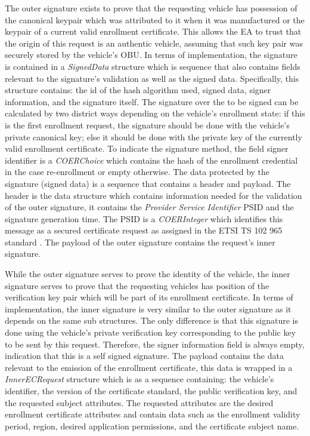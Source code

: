 The outer signature exists to prove that the requesting vehicle has possession of the canonical keypair which was attributed to it when it was manufactured or the keypair of a current valid enrollment certificate. This allows the EA to trust that the origin of this request is an authentic vehicle, assuming that such key pair was securely stored by the vehicle's OBU. In terms of implementation, the signature is contained in a \textit{SignedData} structure which is sequence that also contains fields relevant to the signature's validation as well as the signed data. Specifically, this structure contains: the id of the hash algorithm used, signed data, signer information, and the signature itself. The signature over the to be signed can be calculated by two district ways depending on the vehicle's enrollment state: if this is the first enrollment request, the signature should be done with the vehicle's private canonical key; else it should be done with the private key of the currently valid enrollment certificate. To indicate the signature method, the field signer identifier is a \textit{COERChoice} which contains the hash of the enrollment credential in the case re-enrollment or empty otherwise. The data protected by the signature (signed data) is a sequence that contains a header and payload. The header is the data structure which contains information needed for the validation of the outer signature, it contains the \textit{Provider Service Identifier} PSID and the signature generation time. The PSID is a \textit{COERInteger} which identifies this message as a secured certificate request as assigned in the ETSI TS 102 965 standard \cite{etsi_PSID}. The payload of the outer signature contains the request's inner signature.

While the outer signature serves to prove the identity of the vehicle, the inner signature serves to prove that the requesting vehicles has position of the verification key pair which will be part of its enrollment certificate. In terms of implementation, the inner signature is very similar to the outer signature as it depends on the same sub structures. The only difference is that this signature is done using the vehicle's private verification key corresponding to the public key to be sent by this request. Therefore, the signer information field is always empty, indication that this is a self signed signature. The payload contains the data relevant to the emission of the enrollment certificate, this data is wrapped in a \textit{InnerECRequest} structure which is as a sequence containing: the vehicle's identifier, the version of the certificate standard, the public verification key, and the requested subject attributes. The requested attributes are the desired enrollment certificate attributes and contain data such as the enrollment validity period, region, desired application permissions, and the certificate subject name. 

